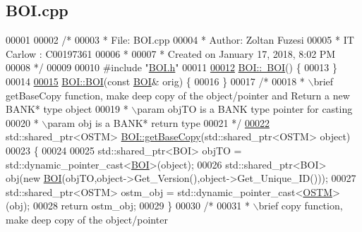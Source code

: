 \hypertarget{_b_o_i_8cpp_source}{}\subsection{B\+O\+I.\+cpp}

\begin{DoxyCode}
00001 
00002 \textcolor{comment}{/* }
00003 \textcolor{comment}{ * File:   BOI.cpp}
00004 \textcolor{comment}{ * Author: Zoltan Fuzesi}
00005 \textcolor{comment}{ * IT Carlow : C00197361}
00006 \textcolor{comment}{ *}
00007 \textcolor{comment}{ * Created on January 17, 2018, 8:02 PM}
00008 \textcolor{comment}{ */}
00009 
00010 \textcolor{preprocessor}{#include "\hyperlink{_b_o_i_8h}{BOI.h}"}
00011 
\hypertarget{_b_o_i_8cpp_source.tex_l00012}{}\hyperlink{class_b_o_i_a617f46a599129178c6b11b4846759a6c_a617f46a599129178c6b11b4846759a6c}{00012} \hyperlink{class_b_o_i_a617f46a599129178c6b11b4846759a6c_a617f46a599129178c6b11b4846759a6c}{BOI::~BOI}() \{
00013 \}
00014 
\hypertarget{_b_o_i_8cpp_source.tex_l00015}{}\hyperlink{class_b_o_i_a7757de8d3ac656871bed4b07d77457ff_a7757de8d3ac656871bed4b07d77457ff}{00015} \hyperlink{class_b_o_i_a6af682a5f199a029681f0cb2b8658706_a6af682a5f199a029681f0cb2b8658706}{BOI::BOI}(\textcolor{keyword}{const} \hyperlink{class_b_o_i}{BOI}& orig) \{
00016 \}
00017 \textcolor{comment}{/*}
00018 \textcolor{comment}{ * \(\backslash\)brief getBaseCopy function, make deep copy of the object/pointer and Return a new BANK* type object}
00019 \textcolor{comment}{ * \(\backslash\)param objTO is a BANK type pointer for casting}
00020 \textcolor{comment}{ * \(\backslash\)param obj is a BANK* return type}
00021 \textcolor{comment}{ */}
\hypertarget{_b_o_i_8cpp_source.tex_l00022}{}\hyperlink{class_b_o_i_ad53ae2918a656793b9d7a670d35ecfa3_ad53ae2918a656793b9d7a670d35ecfa3}{00022} std::shared\_ptr<OSTM> \hyperlink{class_b_o_i_ad53ae2918a656793b9d7a670d35ecfa3_ad53ae2918a656793b9d7a670d35ecfa3}{BOI::getBaseCopy}(std::shared\_ptr<OSTM> \textcolor{keywordtype}{object})
00023 \{
00024 
00025     std::shared\_ptr<BOI> objTO = std::dynamic\_pointer\_cast<\hyperlink{class_b_o_i}{BOI}>(object);
00026     std::shared\_ptr<BOI> obj(\textcolor{keyword}{new} \hyperlink{class_b_o_i_a6af682a5f199a029681f0cb2b8658706_a6af682a5f199a029681f0cb2b8658706}{BOI}(objTO,object->Get\_Version(),\textcolor{keywordtype}{object}->Get\_Unique\_ID())); 
00027     std::shared\_ptr<OSTM> ostm\_obj = std::dynamic\_pointer\_cast<\hyperlink{class_o_s_t_m}{OSTM}>(obj);
00028     \textcolor{keywordflow}{return} ostm\_obj;
00029 \}
00030 \textcolor{comment}{/*}
00031 \textcolor{comment}{ * \(\backslash\)brief copy function, make deep copy of the object/pointer}

\end{DoxyCode}
